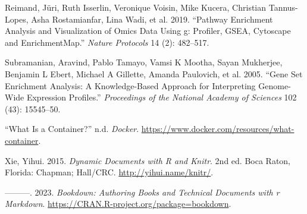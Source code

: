 \documentclass[
]{book}
\newenvironment{Shaded}{\begin{snugshade}}{\end{snugshade}}
\newcommand{\AttributeTok}[1]{\textcolor[rgb]{0.77,0.63,0.00}{#1}}
\newcommand{\ConstantTok}[1]{\textcolor[rgb]{0.00,0.00,0.00}{#1}}
\newcommand{\DecValTok}[1]{\textcolor[rgb]{0.00,0.00,0.81}{#1}}
\newcommand{\FunctionTok}[1]{\textcolor[rgb]{0.00,0.00,0.00}{#1}}
\newcommand{\NormalTok}[1]{#1}
\newcommand{\OtherTok}[1]{\textcolor[rgb]{0.56,0.35,0.01}{#1}}
\newcommand{\SpecialCharTok}[1]{\textcolor[rgb]{0.00,0.00,0.00}{#1}}
\newcommand{\StringTok}[1]{\textcolor[rgb]{0.31,0.60,0.02}{#1}}
\newlength{\cslhangindent}
\newlength{\cslentryspacingunit} %
\newenvironment{CSLReferences}[2] %
 {%
  \setlength{\parindent}{0pt}
  \ifodd #1
  \let\oldpar\par
  \def\par{\hangindent=\cslhangindent\oldpar}
  \fi
  \setlength{\parskip}{#2\cslentryspacingunit}
 }%
 {}
\begin{document}
\begin{Shaded}
\end{Shaded}

\hypertarget{refs}{}
\begin{CSLReferences}{1}{0}
\leavevmode{}%
Reimand, Jüri, Ruth Isserlin, Veronique Voisin, Mike Kucera, Christian Tannus-Lopes, Asha Rostamianfar, Lina Wadi, et al. 2019. {``Pathway Enrichment Analysis and Visualization of Omics Data Using g: Profiler, GSEA, Cytoscape and EnrichmentMap.''} \emph{Nature Protocols} 14 (2): 482--517.

\leavevmode{}%
Subramanian, Aravind, Pablo Tamayo, Vamsi K Mootha, Sayan Mukherjee, Benjamin L Ebert, Michael A Gillette, Amanda Paulovich, et al. 2005. {``Gene Set Enrichment Analysis: A Knowledge-Based Approach for Interpreting Genome-Wide Expression Profiles.''} \emph{Proceedings of the National Academy of Sciences} 102 (43): 15545--50.

\leavevmode{}%
{``What Is a Container?''} n.d. \emph{Docker}. \url{https://www.docker.com/resources/what-container}.

\leavevmode{}%
Xie, Yihui. 2015. \emph{Dynamic Documents with {R} and Knitr}. 2nd ed. Boca Raton, Florida: Chapman; Hall/CRC. \url{http://yihui.name/knitr/}.

\leavevmode{}%
---------. 2023. \emph{Bookdown: Authoring Books and Technical Documents with r Markdown}. \url{https://CRAN.R-project.org/package=bookdown}.

\end{CSLReferences}
\end{document}
